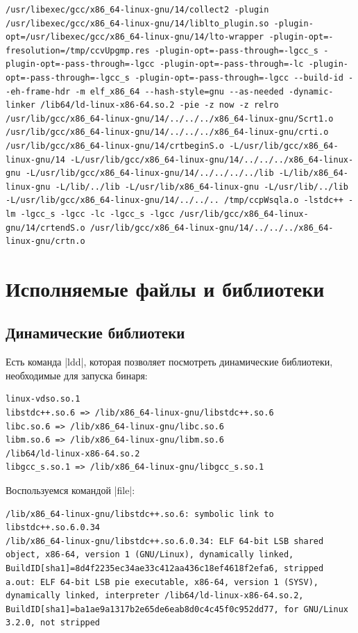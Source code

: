 \documentclass[11pt]{article}
\begin{document}
\begin{lstlisting}
/usr/libexec/gcc/x86_64-linux-gnu/14/collect2 -plugin /usr/libexec/gcc/x86_64-linux-gnu/14/liblto_plugin.so -plugin-opt=/usr/libexec/gcc/x86_64-linux-gnu/14/lto-wrapper -plugin-opt=-fresolution=/tmp/ccvUpgmp.res -plugin-opt=-pass-through=-lgcc_s -plugin-opt=-pass-through=-lgcc -plugin-opt=-pass-through=-lc -plugin-opt=-pass-through=-lgcc_s -plugin-opt=-pass-through=-lgcc --build-id --eh-frame-hdr -m elf_x86_64 --hash-style=gnu --as-needed -dynamic-linker /lib64/ld-linux-x86-64.so.2 -pie -z now -z relro /usr/lib/gcc/x86_64-linux-gnu/14/../../../x86_64-linux-gnu/Scrt1.o /usr/lib/gcc/x86_64-linux-gnu/14/../../../x86_64-linux-gnu/crti.o /usr/lib/gcc/x86_64-linux-gnu/14/crtbeginS.o -L/usr/lib/gcc/x86_64-linux-gnu/14 -L/usr/lib/gcc/x86_64-linux-gnu/14/../../../x86_64-linux-gnu -L/usr/lib/gcc/x86_64-linux-gnu/14/../../../../lib -L/lib/x86_64-linux-gnu -L/lib/../lib -L/usr/lib/x86_64-linux-gnu -L/usr/lib/../lib -L/usr/lib/gcc/x86_64-linux-gnu/14/../../.. /tmp/ccpWsqla.o -lstdc++ -lm -lgcc_s -lgcc -lc -lgcc_s -lgcc /usr/lib/gcc/x86_64-linux-gnu/14/crtendS.o /usr/lib/gcc/x86_64-linux-gnu/14/../../../x86_64-linux-gnu/crtn.o
\end{lstlisting}

\section{Исполняемые файлы и библиотеки}

\subsection{Динамические библиотеки}

Есть команда \nolint|ldd|, которая позволяет посмотреть динамические
библиотеки, необходимые для запуска бинаря:

\begin{lstlisting}
linux-vdso.so.1
libstdc++.so.6 => /lib/x86_64-linux-gnu/libstdc++.so.6
libc.so.6 => /lib/x86_64-linux-gnu/libc.so.6
libm.so.6 => /lib/x86_64-linux-gnu/libm.so.6
/lib64/ld-linux-x86-64.so.2
libgcc_s.so.1 => /lib/x86_64-linux-gnu/libgcc_s.so.1
\end{lstlisting}

Воспользуемся командой \nolint|file|:

\begin{lstlisting}
/lib/x86_64-linux-gnu/libstdc++.so.6: symbolic link to libstdc++.so.6.0.34
/lib/x86_64-linux-gnu/libstdc++.so.6.0.34: ELF 64-bit LSB shared object, x86-64, version 1 (GNU/Linux), dynamically linked, BuildID[sha1]=8d4f2235ec34ae33c412aa436c18ef4618f2efa6, stripped
a.out: ELF 64-bit LSB pie executable, x86-64, version 1 (SYSV), dynamically linked, interpreter /lib64/ld-linux-x86-64.so.2, BuildID[sha1]=ba1ae9a1317b2e65de6eab8d0c4c45f0c952dd77, for GNU/Linux 3.2.0, not stripped
\end{lstlisting}
\end{document}
